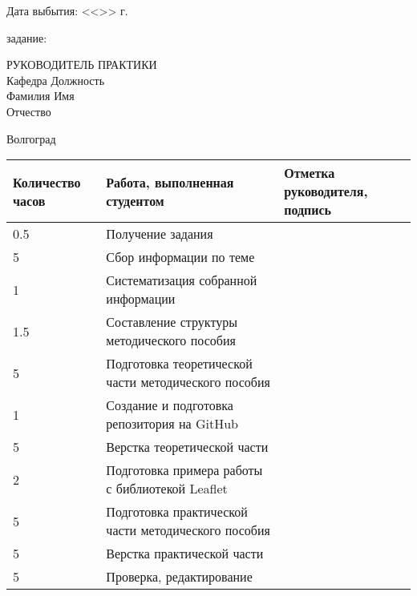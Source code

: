\documentclass[a4paper, 14pt]{extreport}
\begin{document}
\begin{titlepage}
\begin{flushleft}
            Дата выбытия: \hspace{3cm}<<\underline{\hspace{1cm}}>> \underline{\hspace{3cm}} \the\year г.
        \end{flushleft}
        \vspace{1cm}
         задание: \underline{\hspace{10.7cm}}\\
        \underline{\hspace{16.5cm}}
        \vspace{1cm}
        \begin{flushleft}
            РУКОВОДИТЕЛЬ ПРАКТИКИ\\
            Кафедра \underline{\hspace{5cm}} Должность \underline{\hspace{5cm}} \\
            Фамилия \underline{\hspace{4.9cm}} Имя \underline{\hspace{6.5cm}}\\
            Отчество \underline{\hspace{4.9cm}}
        \end{flushleft}
        \vspace{\fill}
        \begin{center}
            Волгоград \the\year
        \end{center}
    \end{titlepage}
    \begin{table}[h!]
        \centering
        \begin{tabular}{|m{}|m{}|m{}|}
            \hline 
            Количество часов & Работа, выполненная студентом & Отметка руководителя, подпись \\ \hline
            0.5 & Получение задания & \\ \hline
              5 & Сбор информации по теме & \\ \hline
              1 & Систематизация собранной информации & \\ \hline
            1.5 & Составление структуры методического пособия & \\ \hline
              5 & Подготовка теоретической части методического пособия & \\ \hline
              1 & Создание и подготовка репозитория на GitHub & \\ \hline
              5 & Верстка теоретической части & \\ \hline
              2 & Подготовка примера работы с библиотекой Leaflet & \\ \hline
              5 & Подготовка практической части методического пособия & \\ \hline
              5 & Верстка практической части & \\ \hline
              5 & Проверка, редактирование & \\ \hline
        \end{tabular}
    \end{table}
\end{document}

